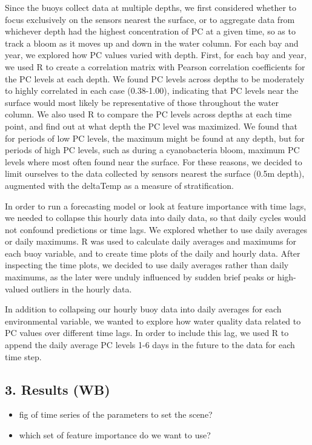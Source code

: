 \documentclass[]{article}
\providecommand{\tightlist}{%
  \setlength{\itemsep}{0pt}\setlength{\parskip}{0pt}}
\begin{document}
Since the buoys collect data at multiple depths, we first considered
whether to focus exclusively on the sensors nearest the surface, or to
aggregate data from whichever depth had the highest concentration of PC
at a given time, so as to track a bloom as it moves up and down in the
water column. For each bay and year, we explored how PC values varied
with depth. First, for each bay and year, we used R to create a
correlation matrix with Pearson correlation coefficients for the PC
levels at each depth. We found PC levels across depths to be moderately
to highly correlated in each case (0.38-1.00), indicating that PC levels
near the surface would most likely be representative of those throughout
the water column. We also used R to compare the PC levels across depths
at each time point, and find out at what depth the PC level was
maximized. We found that for periods of low PC levels, the maximum might
be found at any depth, but for periods of high PC levels, such as during
a cyanobacteria bloom, maximum PC levels where most often found near the
surface. For these reasons, we decided to limit ourselves to the data
collected by sensors nearest the surface (0.5m depth), augmented with
the deltaTemp as a measure of stratification.

In order to run a forecasting model or look at feature importance with
time lags, we needed to collapse this hourly data into daily data, so
that daily cycles would not confound predictions or time lags. We
explored whether to use daily averages or daily maximums. R was used to
calculate daily averages and maximums for each buoy variable, and to
create time plots of the daily and hourly data. After inspecting the
time plots, we decided to use daily averages rather than daily maximums,
as the later were unduly influenced by sudden brief peaks or high-valued
outliers in the hourly data.

In addition to collapsing our hourly buoy data into daily averages for
each environmental variable, we wanted to explore how water quality data
related to PC values over different time lags. In order to include this
lag, we used R to append the daily average PC levels 1-6 days in the
future to the data for each time step.

\hypertarget{results-wb}{%
\subsection{3. Results (WB)}\label{results-wb}}

\begin{itemize}
\tightlist
\item
  fig of time series of the parameters to set the scene?
\item
  which set of feature importance do we want to use?
\end{itemize}
\end{document}
